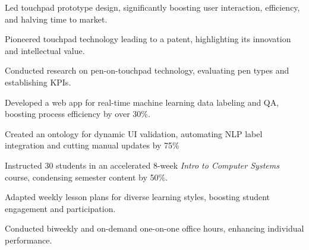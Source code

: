 \documentclass[]{resume-openfont}
\begin{document}
\begin{minipage}[t]{1\textwidth}
        \begin{tightemize}
            \item Led touchpad prototype design, significantly boosting user interaction, efficiency, and halving time to market.
            \item Pioneered touchpad technology leading to a patent, highlighting its innovation and intellectual value.
            \item Conducted research on pen-on-touchpad technology, evaluating pen types and establishing KPIs.
        \end{tightemize}

        \begin{tightemize}
            \item Developed a web app for real-time machine learning data labeling and QA, boosting process efficiency by over 30\%.
            \item Created an ontology for dynamic UI validation, automating NLP label integration and cutting manual updates by 75\%
        \end{tightemize}

        \begin{tightemize}
            \item Instructed 30 students in an accelerated 8-week {\it Intro to Computer Systems} course, condensing semester content by 50\%.
            \item Adapted weekly lesson plans for diverse learning styles, boosting student engagement and participation.
            \item Conducted biweekly and on-demand one-on-one office hours, enhancing individual performance.
        \end{tightemize}
    \end{minipage}
\end{document}
